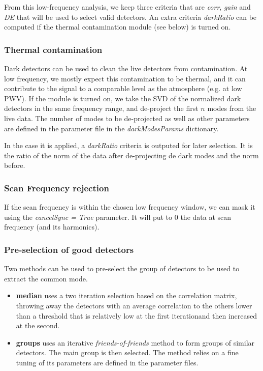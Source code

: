 \documentclass[a4paper, 11pt]{article}
\begin{document}
From this low-frequency analysis, we keep three criteria that are \emph{corr}, \emph{gain} and \emph{DE} that will be used to select valid detectors. An extra criteria  \emph{darkRatio} can be computed if the thermal contamination module (see below) is turned on.


\subsubsection*{Thermal contamination}
Dark detectors can be used to clean the live detectors from contamination. At low frequency, we mostly expect this contamination to be thermal, and it can contribute to the signal to a comparable level as the atmosphere (e.g. at low PWV). If the module is turned on, we take the SVD of the normalized dark detectors in the same frequency range, and de-project the first $n$ modes from the live data. The number of modes to be de-projected as well as other parameters are defined in the parameter file in the \emph{darkModesParams} dictionary.

In the case it is applied, a \emph{darkRatio} criteria is outputed for later selection. It is the ratio of the norm of the data after de-projecting de dark modes and the norm before.

\subsubsection*{Scan Frequency rejection}
If the scan frequency is within the chosen low frequency window, we can mask it using the \emph{cancelSync = True} parameter. It will put to $0$ the data at scan frequency (and its harmonics).

\subsubsection*{Pre-selection of good detectors}
Two methods can be used to pre-select the group of detectors to be used to extract the common mode.
\begin{itemize}
	\item \textbf{median} uses a two iteration selection based on the correlation matrix, throwing away the detectors with an average correlation to the others lower than a threshold that is relatively low at the first iterationand then increased at the second.
	\item \textbf{groups} uses an iterative \emph{friends-of-friends} method to form groups of similar detectors. The main group is then selected. The method relies on a fine tuning of its parameters are defined in the parameter files.
\end{itemize}
\end{document}
